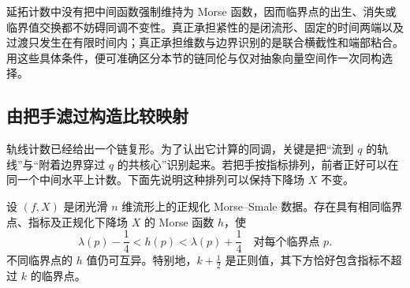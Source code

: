 延拓计数中没有把中间函数强制维持为 Morse 函数，因而临界点的出生、消失或临界值交换都不妨碍同调不变性。真正承担紧性的是闭流形、固定的时间两端以及过渡只发生在有限时间内；真正承担维数与边界识别的是联合横截性和端部粘合。用这些具体条件，便可准确区分本节的链同伦与仅对抽象向量空间作一次同构选择。

\subsection{由把手滤过构造比较映射}
\label{g2:subsec:1804:03}

轨线计数已经给出一个链复形。为了认出它计算的同调，关键是把“流到 \(q\) 的轨线”与“附着边界穿过 \(q\) 的共核心”识别起来。若把手按指标排列，前者正好可以在同一个中间水平上计数。下面先说明这种排列可以保持下降场 \(X\) 不变。

\begin{lemma}\label{g2:lem:morse-value-rearrangement}
	设 \((f,X)\) 是闭光滑 \(n\) 维流形上的正规化 Morse--Smale 数据。存在具有相同临界点、指标及正规化下降场 \(X\) 的 Morse 函数 \(h\)，使
	\[
		\lambda(p)-\frac14<h(p)<\lambda(p)+\frac14
		\quad\text{对每个临界点 }p.
	\]
	不同临界点的 \(h\) 值仍可互异。特别地，\(k+\frac12\) 是正则值，其下方恰好包含指标不超过 \(k\) 的临界点。
\end{lemma}
